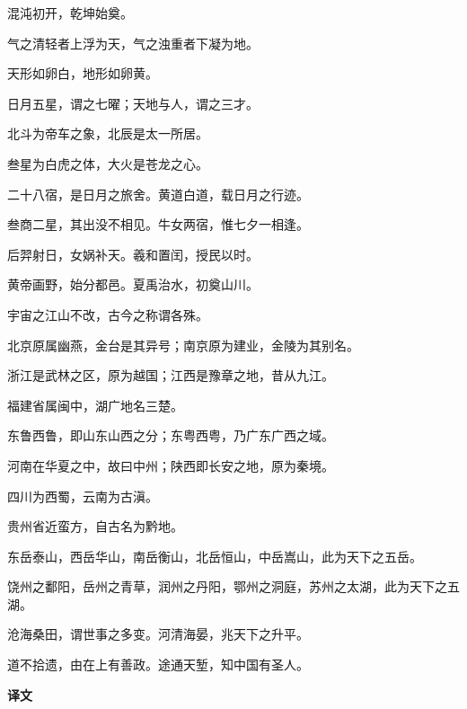 \documentclass[12pt,UTF-8,openany,a4]{ctexbook}
\begin{document}
\begin{large}
    
    混沌初开，乾坤始奠。
    
    气之清轻者上浮为天，气之浊重者下凝为地。
    
    天形如卵白，地形如卵黄。
    
    日月五星，谓之七曜；天地与人，谓之三才。
    
    北斗为帝车之象，北辰是太一所居。
    
    叁星为白虎之体，大火是苍龙之心。
    
    二十八宿，是日月之旅舍。黄道白道，载日月之行迹。
    
    叁商二星，其出没不相见。牛女两宿，惟七夕一相逢。
    
    后羿射日，女娲补天。羲和置闰，授民以时。
    
    黄帝画野，始分都邑。夏禹治水，初奠山川。
    
    宇宙之江山不改，古今之称谓各殊。
    
    北京原属幽燕，金台是其异号；南京原为建业，金陵为其别名。
    
    浙江是武林之区，原为越国；江西是豫章之地，昔从九江。
    
    福建省属闽中，湖广地名三楚。
    
    东鲁西鲁，即山东山西之分；东粤西粤，乃广东广西之域。
    
    河南在华夏之中，故曰中州；陕西即长安之地，原为秦境。
    
    四川为西蜀，云南为古滇。
    
    贵州省近蛮方，自古名为黔地。
    
    东岳泰山，西岳华山，南岳衡山，北岳恒山，中岳嵩山，此为天下之五岳。
    
    饶州之鄱阳，岳州之青草，润州之丹阳，鄂州之洞庭，苏州之太湖，此为天下之五湖。
    
    沧海桑田，谓世事之多变。河清海晏，兆天下之升平。
    
    道不拾遗，由在上有善政。途通天堑，知中国有圣人。
\end{large}


\newpage

\begin{Large}
    \noindent\textbf{译文}
\end{Large}


\vspace{1em}
\end{document}
